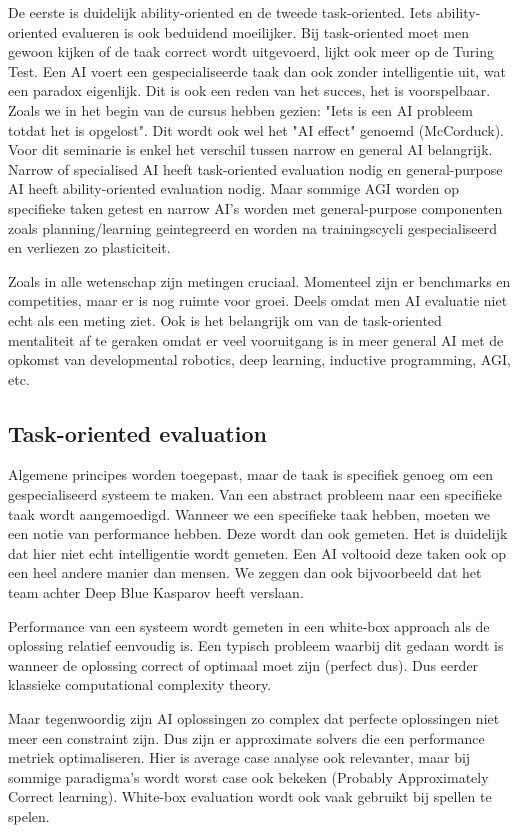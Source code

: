 \documentclass[11pt]{article}
\begin{document}
De eerste is duidelijk ability-oriented en de tweede task-oriented. Iets ability-oriented evalueren is ook beduidend moeilijker. Bij task-oriented moet men gewoon kijken of de taak correct wordt uitgevoerd, lijkt ook meer op de Turing Test. Een AI voert een gespecialiseerde taak dan ook zonder intelligentie uit, wat een paradox eigenlijk. Dit is ook een reden van het succes, het is voorspelbaar. Zoals we in het begin van de cursus hebben gezien: "Iets is een AI probleem totdat het is opgelost". Dit wordt ook wel het "AI effect" genoemd (McCorduck). Voor dit seminarie is enkel het verschil tussen narrow en general AI belangrijk. Narrow of specialised AI heeft task-oriented evaluation nodig en general-purpose AI heeft ability-oriented evaluation nodig. Maar sommige AGI worden op specifieke taken getest en narrow AI's worden met general-purpose componenten zoals planning/learning geintegreerd en worden na trainingscycli gespecialiseerd en verliezen zo plasticiteit.

Zoals in alle wetenschap zijn metingen cruciaal. Momenteel zijn er benchmarks en competities, maar er is nog ruimte voor groei. Deels omdat men AI evaluatie niet echt als een meting ziet. Ook is het belangrijk om van de task-oriented mentaliteit af te geraken omdat er veel vooruitgang is in meer general AI met de opkomst van developmental robotics, deep learning, inductive programming, AGI, etc.

\subsection{Task-oriented evaluation}
\label{sec:org0839219}

Algemene principes worden toegepast, maar de taak is specifiek genoeg om een gespecialiseerd systeem te maken.
Van een abstract probleem naar een specifieke taak wordt aangemoedigd. Wanneer we een specifieke taak hebben, moeten we een notie van performance hebben. Deze wordt dan ook gemeten. Het is duidelijk dat hier niet echt intelligentie wordt gemeten. Een AI voltooid deze taken ook op een heel andere manier dan mensen. We zeggen dan ook bijvoorbeeld dat het team achter Deep Blue Kasparov heeft verslaan.

Performance van een systeem wordt gemeten in een white-box approach als de oplossing relatief eenvoudig is. Een typisch probleem waarbij dit gedaan wordt is wanneer de oplossing correct of optimaal moet zijn (perfect dus). Dus eerder klassieke computational complexity theory.

Maar tegenwoordig zijn AI oplossingen zo complex dat perfecte oplossingen niet meer een constraint zijn. Dus zijn er approximate solvers die een performance metriek optimaliseren. Hier is average case analyse ook relevanter, maar bij sommige paradigma's wordt worst case ook bekeken (Probably Approximately Correct
learning). White-box evaluation wordt ook vaak gebruikt bij spellen te spelen.
\end{document}
